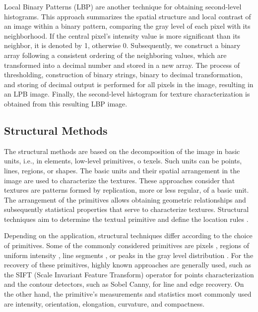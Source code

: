 Local Binary Patterns (LBP) \citep{Ojala.Pietikainen.ea:PR:1996} are another technique for obtaining second-level histograms. This approach summarizes the spatial structure and local contrast of an image within a binary pattern, comparing the gray level of each pixel with its neighborhood. If the central pixel's intensity value is more significant than its neighbor, it is denoted by 1, otherwise 0. Subsequently, we construct a binary array following a consistent ordering of the neighboring values, which are transformed into a decimal number and stored in a new array. The process of thresholding, construction of binary strings, binary to decimal transformation, and storing of decimal output is performed for all pixels in the image, resulting in an LPB image. Finally, the second-level histogram for texture characterization is obtained from this resulting LBP image.


\subsection{Structural Methods}
The structural methods are based on the decomposition of the image in basic units, i.e., in elements, low-level primitives, o texels. Such units can be points, lines, regions, or shapes. The basic units and their spatial arrangement in the image are used to characterize the textures. These approaches consider that textures are patterns formed by replication, more or less regular, of a basic unit. The arrangement of the primitives allows obtaining geometric relationships and subsequently statistical properties that serve to characterize textures. Structural techniques aim to determine the textual primitive and define the location rules \citep{Humeau-Heurtier:ACCESS:2019}.

Depending on the application, structural techniques differ according to the choice of primitives. Some of the commonly considered primitives are pixels \citep{Lu.Fu:CGIP:1978}, regions of uniform intensity \citep{Tuceryan.Jain:WS:1993}, line segments \citep{Carlucci:PR:1972}, or peaks in the gray level distribution \citep{Ehrich.Foith:CGIP:1978}. For the recovery of these primitives, highly known approaches are generally used, such as the SIFT (Scale Invariant Feature Transform) operator for points characterization and the contour detectors, such as Sobel Canny, for line and edge recovery. On the other hand, the primitive's measurements and statistics most commonly used are intensity, orientation, elongation, curvature, and compactness.

